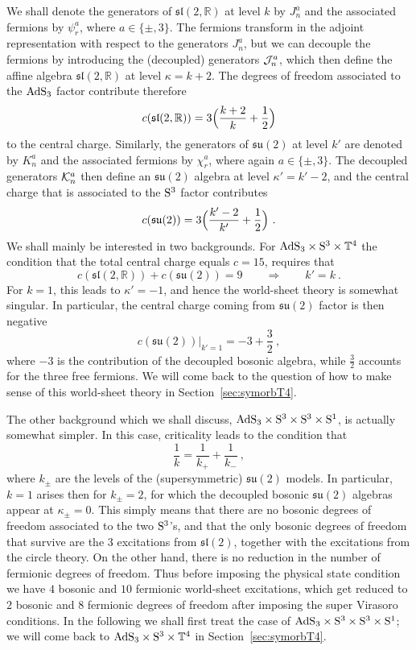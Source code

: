 \documentclass[12pt,a4paper]{article}
\newcommand{\be}{ \begin{equation}}
\newcommand{\ee}{\end{equation}}
\newcommand{\cJ}{{\cal J}}
\newcommand{\cK}{{\cal K}}
\begin{document}
We shall denote the generators of $\mathfrak{sl}(2,\mathbb{R})$ at level $k$ by $J^a_n$ and the associated fermions by $\psi^a_r$, where $a\in\{\pm,3\}$. The fermions transform in the adjoint representation with respect to the generators $J^a_n$, but we can decouple the fermions by introducing the (decoupled) generators $\cJ^a_n$, which then define the affine algebra $\mathfrak{sl}(2,\mathbb{R})$ at level $\kappa=k+2$. The degrees of freedom associated to the ${\rm AdS}_3$ factor contribute therefore
\be
c ( \mathfrak{sl}(2,\mathbb{R}) ) = 3 \Bigl( \frac{k+2}{k} + \frac{1}{2} \Bigr)  
\ee
to the central charge. Similarly, the generators of $\mathfrak{su}(2)$ at level $k'$ are denoted by $K^a_n$ and the associated fermions by $\chi^a_r$, where again $a\in\{\pm,3\}$. The decoupled generators $\cK^a_n$ then define an $\mathfrak{su}(2)$ algebra at level $\kappa'=k'-2$, and the central charge that is associated to the ${\rm S}^3$ factor contributes
\be
c ( \mathfrak{su}(2) ) = 3 \Bigl( \frac{k'-2}{k'} + \frac{1}{2} \Bigr) \  . 
\ee
We shall mainly be interested in two backgrounds. For ${\rm AdS}_3 \times {\rm S}^3 \times \mathbb{T}^4$ the condition that the total central charge equals $c=15$, requires that 
\be
c ( \mathfrak{sl}(2,\mathbb{R}) )  +  c ( \mathfrak{su}(2) ) = 9  \qquad \Rightarrow \qquad k' = k \ . 
\ee
For $k=1$, this leads to $\kappa'=-1$, and hence the world-sheet theory is somewhat singular. In particular, the central charge coming from $\mathfrak{su}(2)$ factor is then negative 
\be\label{csu2}
\left. c ( \mathfrak{su}(2) )  \right|_{k'=1} = - 3  + \frac{3}{2} \ ,
\ee
where $-3$ is the contribution of the decoupled bosonic algebra, while $\frac{3}{2}$ accounts for the three free fermions. We will come back to the question of how to make sense of this world-sheet theory in Section~\ref{sec:symorbT4}.
\smallskip

The other background which we shall discuss, ${\rm AdS}_3 \times {\rm S}^3 \times {\rm S}^3 \times {\rm S}^1$, is actually somewhat simpler. In this case, criticality leads to the condition \cite{Elitzur:1998mm} that 
\be
\frac{1}{k} = \frac{1}{k_+} + \frac{1}{k_-} \ , 
\ee
where $k_\pm$ are the levels of the (supersymmetric) $\mathfrak{su}(2)$ models. In particular, $k=1$ arises then for $k_\pm=2$, for which the decoupled bosonic $\mathfrak{su}(2)$ algebras appear at $\kappa_{\pm}=0$. This simply means that there are no bosonic degrees of freedom associated to the two ${\rm S}^3$'s, and that the only bosonic degrees of freedom that survive are the $3$ excitations from $\mathfrak{sl}(2)$, together with the excitations from the circle theory. On the other hand, there is no reduction in the number of fermionic degrees of freedom. Thus before imposing the physical state condition we have $4$ bosonic and $10$ fermionic world-sheet excitations, which get reduced to $2$ bosonic and $8$ fermionic degrees of freedom after imposing the super Virasoro conditions. 
In the following we shall first treat the case of ${\rm AdS}_3\times {\rm S}^3 \times {\rm S}^3 \times {\rm S}^1$; we will come back to 
${\rm AdS}_3\times {\rm S}^3 \times \mathbb{T}^4$ in Section~\ref{sec:symorbT4}.
\end{document}
